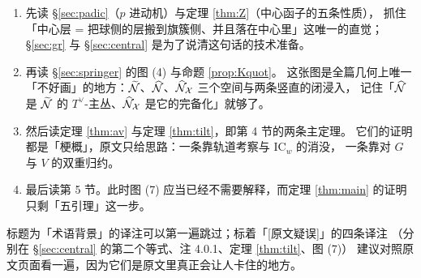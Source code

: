 \begin{enumerate}[leftmargin=2.2em,itemsep=2pt]
\item 先读 \S\ref{sec:padic}（$p$ 进动机）与定理 \ref{thm:Z}（中心函子的五条性质），
      抓住「中心层 = 把球侧的层搬到旗簇侧、并且落在中心里」这唯一的直觉；
      \S\ref{sec:gr} 与 \S\ref{sec:central} 是为了说清这句话的技术准备。
\item 再读 \S\ref{sec:springer} 的图 (4) 与命题 \ref{prop:Kquot}。
      这张图是全篇几何上唯一「不好画」的地方：$\widetilde{\mathcal{N}}$、$\widehat{\mathcal{N}}$、$\widehat{\mathcal{N}}_{\mathcal{X}}$ 三个空间与两条竖直的闭浸入，
      记住「$\widehat{\mathcal{N}}$ 是 $\widetilde{\mathcal{N}}$ 的 $T^\vee$-主丛、$\widehat{\mathcal{N}}_{\mathcal{X}}$ 是它的完备化」就够了。
\item 然后读定理 \ref{thm:av} 与定理 \ref{thm:tilt}，即第 4 节的两条主定理。
      它们的证明都是「梗概」，原文只给思路：一条靠轨道考察与 $\mathrm{IC}_w$ 的消没，
      一条靠对 $G$ 与 $V$ 的双重归约。
\item 最后读第 5 节。此时图 (7) 应当已经不需要解释，而定理 \ref{thm:main} 的证明只剩「五引理」这一步。
\end{enumerate}

标题为「术语背景」的译注可以第一遍跳过；标着「[原文疑误]」的四条译注
（分别在 §\ref{sec:central} 的第二个等式、注 4.0.1、定理 \ref{thm:tilt}、图 (7)）
建议对照原文页面看一遍，因为它们是原文里真正会让人卡住的地方。

